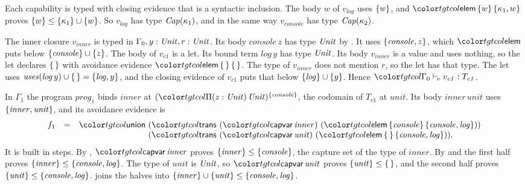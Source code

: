 \begin{example}\label{ex:mini-typing}
Each capability is typed with closing evidence that is a syntactic inclusion. The body $w$ of $v_{\mathit{log}}$ uses $\{w\}$, and $\ev{elem}\,\cset{w}\,\cset{\kappa_1, w}$ proves $\{w\} \le \{\kappa_1\} \cup \{w\}$. So $v_{\mathit{log}}$ has type $\mathit{Cap}(\kappa_1)$, and in the same way $v_{\mathit{console}}$ has type $\mathit{Cap}(\kappa_2)$.

The inner closure $v_{\mathit{inner}}$ is typed in $\Gamma_0, y : \mathit{Unit}, r : \mathit{Unit}$. Its body $\mathit{console}\,z$ has type $\mathit{Unit}$ by . It uses $\{\mathit{console}, z\}$, which $\ev{elem}$ puts below $\{\mathit{console}\} \cup \{z\}$. The body of $v_{\mathit{c1}}$ is a let. Its bound term $\mathit{log}\,y$ has type $\mathit{Unit}$. Its body $v_{\mathit{inner}}$ is a value and uses nothing, so the let declares $\{\,\}$ with avoidance evidence $\ev{elem}\,\cempty\,\cempty$. The type of $v_{\mathit{inner}}$ does not mention $r$, so the let has that type. The let uses $\mathit{uses}(\mathit{log}\,y) \cup \{\,\} = \{\mathit{log}, y\}$, and the closing evidence of $v_{\mathit{c1}}$ puts that below $\{\mathit{log}\} \cup \{y\}$. Hence $\valj{\Gamma_0}{v_{\mathit{c1}}}{T_{\mathit{c1}}}$.

In $\Gamma_1$ the program $\mathit{prog}_1$ binds $\mathit{inner}$ at $\capt{(\pit[z]{\Unit}{\Unit})}{\cset{\mathit{console}}}$, the codomain of $T_{\mathit{c1}}$ at $\mathit{unit}$. Its body $\mathit{inner}\,\mathit{unit}$ uses $\{\mathit{inner}, \mathit{unit}\}$, and its avoidance evidence is
\[
\begin{array}{@{}lcl@{}}
f_1 & = & \ev{union}\ (\ev{trans}\ (\ev{capvar}\,\mathit{inner})\ (\ev{elem}\,\cset{\mathit{console}}\,\cset{\mathit{console}, \mathit{log}})) \\
& & \phantom{\ev{union}}\ (\ev{trans}\ (\ev{capvar}\,\mathit{unit})\ (\ev{elem}\,\cempty\,\cset{\mathit{console}, \mathit{log}})) .
\end{array}
\]
It is built in steps. By , $\ev{capvar}\,\mathit{inner}$ proves $\{\mathit{inner}\} \le \{\mathit{console}\}$, the capture set of the type of $\mathit{inner}$. By  and  the first half proves $\{\mathit{inner}\} \le \{\mathit{console}, \mathit{log}\}$. The type of $\mathit{unit}$ is $\mathit{Unit}$, so $\ev{capvar}\,\mathit{unit}$ proves $\{\mathit{unit}\} \le \{\,\}$, and the second half proves $\{\mathit{unit}\} \le \{\mathit{console}, \mathit{log}\}$.  joins the halves into $\{\mathit{inner}\} \cup \{\mathit{unit}\} \le \{\mathit{console}, \mathit{log}\}$.


\end{example}
